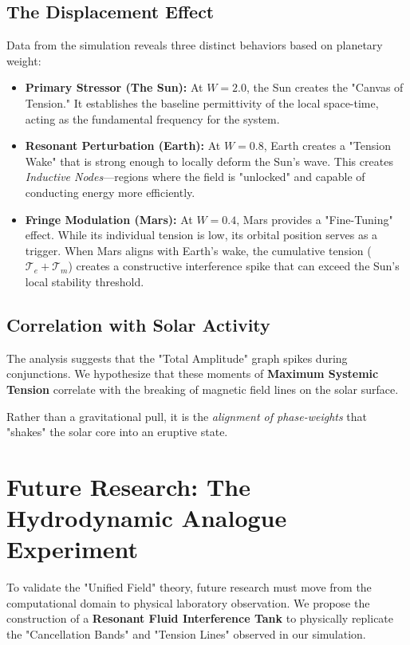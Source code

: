 \documentclass[11pt]{article}
\begin{document}
\subsection*{The Displacement Effect}
Data from the simulation reveals three distinct behaviors based on planetary weight:
\begin{itemize}
    \item \textbf{Primary Stressor (The Sun):} At $W=2.0$, the Sun creates the "Canvas of Tension." It establishes the baseline permittivity of the local space-time, acting as the fundamental frequency for the system.
    \item \textbf{Resonant Perturbation (Earth):} At $W=0.8$, Earth creates a "Tension Wake" that is strong enough to locally deform the Sun's wave. This creates \textit{Inductive Nodes}—regions where the field is "unlocked" and capable of conducting energy more efficiently.
    \item \textbf{Fringe Modulation (Mars):} At $W=0.4$, Mars provides a "Fine-Tuning" effect. While its individual tension is low, its orbital position serves as a trigger. When Mars aligns with Earth’s wake, the cumulative tension ($\mathcal{T}_e + \mathcal{T}_m$) creates a constructive interference spike that can exceed the Sun's local stability threshold.
\end{itemize}

\subsection*{Correlation with Solar Activity}
The analysis suggests that the "Total Amplitude" graph spikes during conjunctions. We hypothesize that these moments of \textbf{Maximum Systemic Tension} correlate with the breaking of magnetic field lines on the solar surface. 

Rather than a gravitational pull, it is the \textit{alignment of phase-weights} that "shakes" the solar core into an eruptive state.

\section*{Future Research: The Hydrodynamic Analogue Experiment}

To validate the "Unified Field" theory, future research must move from the computational domain to physical laboratory observation. We propose the construction of a \textbf{Resonant Fluid Interference Tank} to physically replicate the "Cancellation Bands" and "Tension Lines" observed in our simulation.
\end{document}
